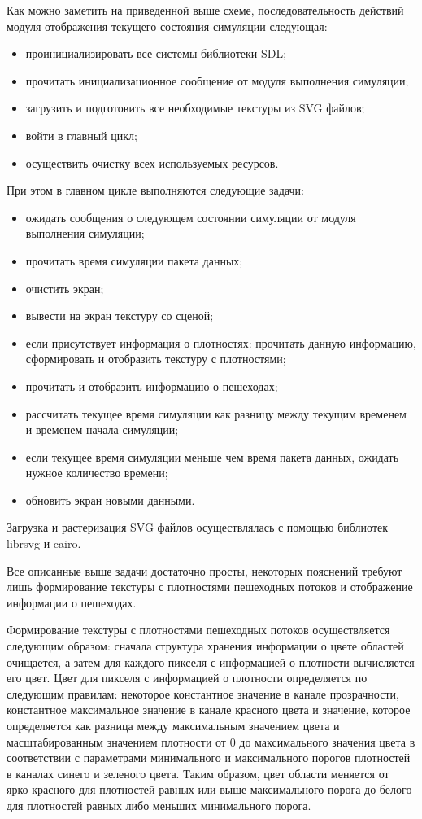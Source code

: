 Как можно заметить на приведенной выше схеме, последовательность действий модуля отображения текущего состояния симуляции следующая:
\begin{itemize}
  \item проинициализировать все системы библиотеки SDL;
  \item прочитать инициализационное сообщение от модуля выполнения симуляции;
  \item загрузить и подготовить все необходимые текстуры из SVG файлов;
  \item войти в главный цикл;
  \item осуществить очистку всех используемых ресурсов.
\end{itemize}

При этом в главном цикле выполняются следующие задачи:
\begin{itemize}
  \item ожидать сообщения о следующем состоянии симуляции от модуля выполнения симуляции;
  \item прочитать время симуляции пакета данных;
  \item очистить экран;
  \item вывести на экран текстуру со сценой;
  \item если присутствует информация о плотностях: прочитать данную информацию, сформировать и отобразить текстуру с плотностями;
  \item прочитать и отобразить информацию о пешеходах;
  \item рассчитать текущее время симуляции как разницу между текущим временем и временем начала симуляции;
  \item если текущее время симуляции меньше чем время пакета данных, ожидать нужное количество времени;
  \item обновить экран новыми данными.
\end{itemize}

Загрузка и растеризация SVG файлов осуществлялась с помощью библиотек librsvg и cairo.

Все описанные выше задачи достаточно просты, некоторых пояснений требуют лишь формирование текстуры с плотностями пешеходных потоков и отображение информации о пешеходах.

Формирование текстуры с плотностями пешеходных потоков осуществляется следующим образом:
сначала структура хранения информации о цвете областей очищается,
а затем для каждого пикселя с информацией о плотности вычисляется его цвет.
Цвет для пикселя с информацией о плотности определяется по следующим правилам:
некоторое константное значение в канале прозрачности,
константное максимальное значение в канале красного цвета и
значение, которое определяется как разница между максимальным значением цвета и масштабированным значением плотности от 0 до максимального значения цвета
в соответствии с параметрами минимального и максимального порогов плотностей в каналах синего и зеленого цвета.
Таким образом, цвет области меняется от ярко-красного для плотностей равных или выше максимального порога до белого для плотностей равных либо меньших минимального порога.

